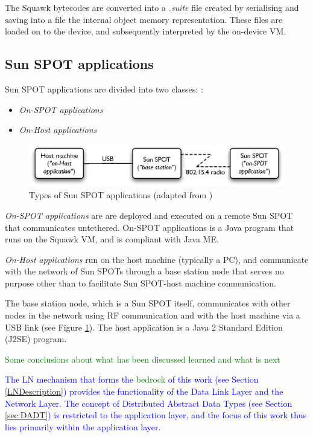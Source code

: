 The Squawk bytecodes are converted into a \emph{.suite} file created by
serialising and saving into a file the internal object memory representation.
These files are loaded on to the device, and subsequently interpreted by the
on-device VM.

\subsection{Sun SPOT applications} \label{subsec:sunspotapps}

Sun SPOT applications are divided into two classes:
\cite{sun_developer:2008}:

\begin{itemize}
  \item \emph{On-SPOT applications}
  \item \emph{On-Host applications}
\end{itemize}

\begin{figure}[h]
\centering
\includegraphics[width=\textwidth]{img/SunSPOTS_applications.eps} 
\caption[Types of Sun SPOT applications]{Types of Sun SPOT applications (adapted from
\cite{sun_developer:2008})}
\label{Fig:SunSPOTS_applications}
\end{figure}  

\emph{On-SPOT applications} are are deployed and
executed on a remote Sun SPOT that communicates untethered. On-SPOT
applications is a Java program that runs on the Squawk VM, and is compliant
with Java ME. 

\emph{On-Host applications} run on the host machine
(typically a PC), and communicate with the network of Sun SPOTs through a base
station node that serves no purpose other than to facilitate Sun SPOT-host
machine communication. 
  
The base station node, which is a Sun SPOT itself, communicates with other
nodes in the network using RF communication and with the host machine via a
USB link (see Figure \ref{Fig:SunSPOTS_applications}). The host application is
a Java 2 Standard Edition (J2SE) program.
  
 

\textcolor{green}{Some conclusions about what has been discussed learned and
what is next}


\textcolor{blue}{The LN mechanism that forms the \textcolor{green}{bedrock} of this work (see Section \ref{LNDescription}) provides the functionality of the Data Link Layer and the Network Layer. The concept of Distributed Abstract
Data Types (see Section \ref{sec:DADT}) is restricted to the application layer, and the focus of this work thus lies primarily within the application layer.}

  